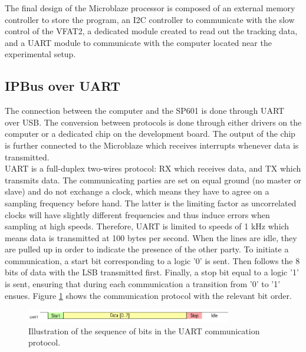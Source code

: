       The final design of the Microblaze processor is composed of an external memory controller to store the program, an I2C controller to communicate with the slow control of the VFAT2, a dedicated module created to read out the tracking data, and a UART module to communicate with the computer located near the experimental setup.

    \subsection{IPBus over UART}

      The connection between the computer and the SP601 is done through UART over USB. The conversion between protocols is done through either drivers on the computer or a dedicated chip on the development board. The output of the chip is further connected to the Microblaze which receives interrupts whenever data is transmitted. \\

      UART is a full-duplex two-wires protocol: RX which receives data, and TX which transmits data. The communicating parties are set on equal ground (no master or slave) and do not exchange a clock, which means they have to agree on a sampling frequency before hand. The latter is the limiting factor as uncorrelated clocks will have slightly different frequencies and thus induce errors when sampling at high speeds. Therefore, UART is limited to speeds of 1 kHz which means data is transmitted at 100 bytes per second. When the lines are idle, they are pulled up in order to indicate the presence of the other party. To initiate a communication, a start bit corresponding to a logic '0' is sent. Then follows the 8 bits of data with the LSB transmitted first. Finally, a stop bit equal to a logic '1' is sent, ensuring that during each communication a transition from '0' to '1' ensues. Figure \ref{fig:III-1-uart} shows the communication protocol with the relevant bit order. \\

      \begin{figure}[h!]
        \centering
        \includegraphics[width=0.8\textwidth]{img/III-1-arch/uart.png}
        \caption{Illustration of the sequence of bits in the UART communication protocol.}
        \label{fig:III-1-uart}
      \end{figure}

